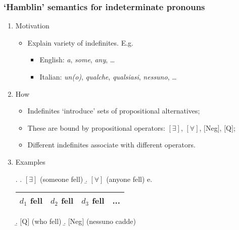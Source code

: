 \documentclass{beamer}
\newcommand\notext[1]{}
\newcommand{\bit}{\begin{itemize}}
\newcommand{\eit}{\end{itemize}}
\newcommand{\ben}{\begin{enumerate}}
\newcommand{\een}{\end{enumerate}}
\newcommand{\btar}{\begin{tabular}}
\newcommand{\etar}{\end{tabular}}
\newcommand{\lin}{\ensuremath{\lbrack\!\lbrack}}
\newcommand{\rin}{\ensuremath{\rbrack\!\rbrack}}
\begin{document}
\frame
{\frametitle{`Hamblin'  semantics for indeterminate pronouns}
\ben
\notext{\pause} \item[]  {\sc Motivation}
\bit
\item
 Explain variety of indefinites. E.g. 
 \bit
 \item English:
   \emph{a}, \emph{some},  \emph{any}, \dots
 \item Italian: \emph{un(o)},  \emph{qualche}, \emph{qualsiasi}, \emph{nessuno}, \dots   \eit \eit
\notext{\pause} \item[]   {\sc How}
\bit
\notext{\pause} \item  Indefinites `introduce'    sets of propositional alternatives;
\notext{\pause} \item These are bound by propositional operators:     $ [ \exists]$, $ [ \forall]$,   $[$Neg$]$, $[$Q$]$;
\notext{\pause} \item  Different   indefinites    associate   with different     operators.  
\eit
\notext{\pause} \item[]  {\sc Examples}


  \ex. \a. $[\exists]$ (someone  fell)  
\b. $[\forall ]$ (anyone  fell) \hfill
     e. {\scriptsize \btar{|c|c|c|c|}  \hline $d_1$ fell  &   $d_2$ fell  & $d_3$ fell & ...
 \\
  \hline
\etar
  }
 \b.  $[$Q$]$ (who fell)  
\b.  $[$Neg$]$ (nessuno cadde)   

 \notext{   $[$Neg$]$: n-words: Italian {\it nessuno},... \item
$[$Q$]$: wh-words: English {\it who},... \item  $ [ \exists]$: existential Fc items: German {\it irgendein} \item
$[\forall ]$: universal FC items: English {\it any}, Italian {\it qualunque} } 

\een }
\end{document}
